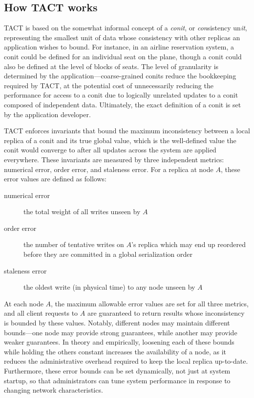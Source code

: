 \subsection{How TACT works}

TACT is based on the somewhat informal concept of a \emph{conit}, or
\emph{con}sistency un\emph{it}, representing the smallest unit of data whose
consistency with other replicas an application wishes to bound. For instance, in
an airline reservation system, a conit could be defined for an individual seat
on the plane, though a conit could also be defined at the level of blocks of
seats. The level of granularity is determined by the
application---coarse-grained conits reduce the bookkeeping required by TACT, at
the potential cost of unnecessarily reducing the performance for access to a
conit due to logically unrelated updates to a conit composed of independent
data.  Ultimately, the exact definition of a conit is set by the application
developer.

TACT enforces invariants that bound the maximum inconsistency between a local
replica of a conit and its true global value, which is the well-defined value
the conit would converge to after all updates across the system are applied
everywhere. These invariants are measured by three independent metrics:
numerical error, order error, and staleness error. For a replica at node $A$,
these error values are defined as follows:

\begin{description}
   \item[numerical error] the total weight of all writes unseen by $A$
   \item[order error] the number of tentative writes on $A$'s replica which may
     end up reordered before they are committed in a global serialization order
   \item[staleness error] the oldest write (in physical time) to any node unseen
     by $A$
\end{description}

At each node $A$, the maximum allowable error values are set for all three
metrics, and all client requests to $A$ are guaranteed to return results whose
inconsistency is bounded by these values. Notably, different nodes may maintain
different bounds---one node may provide strong guarantees, while another may
provide weaker guarantees. In theory and empirically, loosening each of these
bounds while holding the others constant increases the availability of a node,
as it reduces the administrative overhead required to keep the local replica
up-to-date. Furthermore, these error bounds can be set dynamically, not just at
system startup, so that administrators can tune system performance in response
to changing network characteristics.

